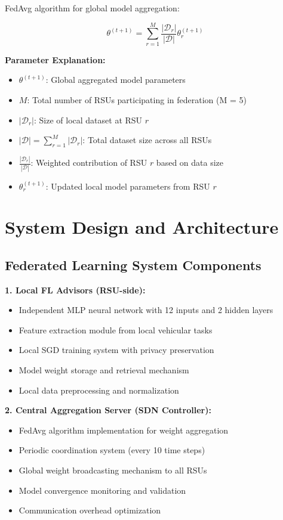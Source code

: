 \documentclass[11pt]{article}
\begin{document}
FedAvg algorithm for global model aggregation:

\begin{equation}
\theta^{(t+1)} = \sum_{r=1}^{M} \frac{|\mathcal{D}_r|}{|\mathcal{D}|} \theta_r^{(t+1)}
\label{eq:fedavg}
\end{equation}

\textbf{Parameter Explanation:}
\begin{itemize}
    \item $\theta^{(t+1)}$: Global aggregated model parameters
    \item $M$: Total number of RSUs participating in federation (M = 5)
    \item $|\mathcal{D}_r|$: Size of local dataset at RSU $r$
    \item $|\mathcal{D}| = \sum_{r=1}^{M} |\mathcal{D}_r|$: Total dataset size across all RSUs
    \item $\frac{|\mathcal{D}_r|}{|\mathcal{D}|}$: Weighted contribution of RSU $r$ based on data size
    \item $\theta_r^{(t+1)}$: Updated local model parameters from RSU $r$
\end{itemize}

\section{System Design and Architecture}

\subsection{Federated Learning System Components}

\textbf{1. Local FL Advisors (RSU-side):}
\begin{itemize}
    \item Independent MLP neural network with 12 inputs and 2 hidden layers
    \item Feature extraction module from local vehicular tasks
    \item Local SGD training system with privacy preservation
    \item Model weight storage and retrieval mechanism
    \item Local data preprocessing and normalization
\end{itemize}

\textbf{2. Central Aggregation Server (SDN Controller):}
\begin{itemize}
    \item FedAvg algorithm implementation for weight aggregation
    \item Periodic coordination system (every 10 time steps)
    \item Global weight broadcasting mechanism to all RSUs
    \item Model convergence monitoring and validation
    \item Communication overhead optimization
\end{itemize}
\end{document}
